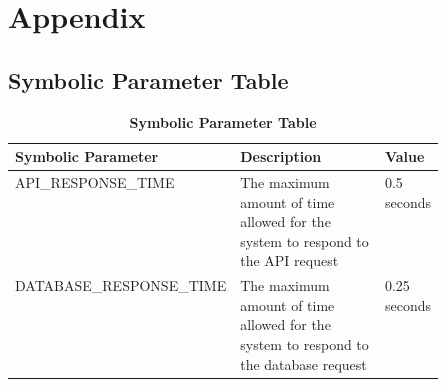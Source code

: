 \documentclass{article}
\begin{document}
\section{Appendix}
\subsection{Symbolic Parameter Table}
\begin{table}[H]
\begin{adjustwidth}{-1in}{-0.5in}
\caption{\bf Symbolic Parameter Table}
\begin{tabular}{|l|p{0.5\linewidth}|l|}
\hline
\multicolumn{1}{|l}{\bfseries Symbolic Parameter} & \multicolumn{1}{|l|}{\bfseries Description} & \multicolumn{1}{l|}{\bfseries Value}\\
\hline
API\_RESPONSE\_TIME & The maximum amount of time allowed for the system to respond to the API request & 0.5 seconds\\
\hline
DATABASE\_RESPONSE\_TIME & The maximum amount of time allowed for the system to respond to the database request & 0.25 seconds\\
\hline

\end{tabular}
\end{adjustwidth}
\end{table}


\newpage
\end{document}
